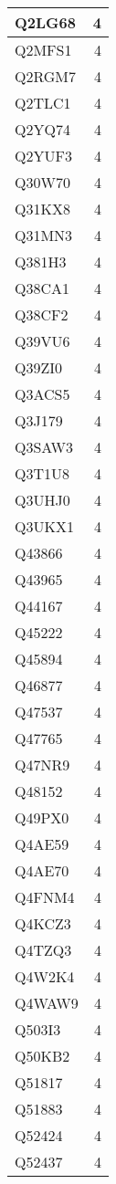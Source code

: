 \documentclass[
]{book}
\theoremstyle{definition}
\theoremstyle{definition}
\theoremstyle{definition}
\theoremstyle{definition}
\theoremstyle{remark}
\begin{document}
\begin{table}
\begin{tabular}{l|r}
\hline
Q2LG68 & 4\\
\hline
Q2MFS1 & 4\\
\hline
Q2RGM7 & 4\\
\hline
Q2TLC1 & 4\\
\hline
Q2YQ74 & 4\\
\hline
Q2YUF3 & 4\\
\hline
Q30W70 & 4\\
\hline
Q31KX8 & 4\\
\hline
Q31MN3 & 4\\
\hline
Q381H3 & 4\\
\hline
Q38CA1 & 4\\
\hline
Q38CF2 & 4\\
\hline
Q39VU6 & 4\\
\hline
Q39ZI0 & 4\\
\hline
Q3ACS5 & 4\\
\hline
Q3J179 & 4\\
\hline
Q3SAW3 & 4\\
\hline
Q3T1U8 & 4\\
\hline
Q3UHJ0 & 4\\
\hline
Q3UKX1 & 4\\
\hline
Q43866 & 4\\
\hline
Q43965 & 4\\
\hline
Q44167 & 4\\
\hline
Q45222 & 4\\
\hline
Q45894 & 4\\
\hline
Q46877 & 4\\
\hline
Q47537 & 4\\
\hline
Q47765 & 4\\
\hline
Q47NR9 & 4\\
\hline
Q48152 & 4\\
\hline
Q49PX0 & 4\\
\hline
Q4AE59 & 4\\
\hline
Q4AE70 & 4\\
\hline
Q4FNM4 & 4\\
\hline
Q4KCZ3 & 4\\
\hline
Q4TZQ3 & 4\\
\hline
Q4W2K4 & 4\\
\hline
Q4WAW9 & 4\\
\hline
Q503I3 & 4\\
\hline
Q50KB2 & 4\\
\hline
Q51817 & 4\\
\hline
Q51883 & 4\\
\hline
Q52424 & 4\\
\hline
Q52437 & 4\\

\end{tabular}
\end{table}
\end{document}
